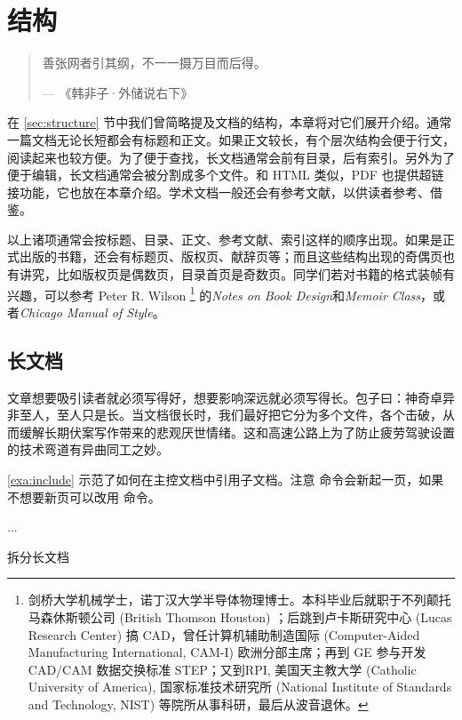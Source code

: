 \chapter{结构}
\label{chp:structure}

\begin{quotation}
善张网者引其纲，不一一摄万目而后得。
\begin{flushright}
--- 《韩非子·外储说右下》
\end{flushright}
\end{quotation}

在 \ref{sec:structure} 节中我们曾简略提及文档的结构，本章将对它们展开介绍。通常一篇文档无论长短都会有标题和正文。如果正文较长，有个层次结构会便于行文，阅读起来也较方便。为了便于查找，长文档通常会前有目录，后有索引。另外为了便于编辑，长文档通常会被分割成多个文件。和 HTML 类似，PDF 也提供超链接功能，它也放在本章介绍。学术文档一般还会有参考文献，以供读者参考、借鉴。

以上诸项通常会按标题、目录、正文、参考文献、索引这样的顺序出现。如果是正式出版的书籍，还会有标题页、版权页、献辞页等；而且这些结构出现的奇偶页也有讲究，比如版权页是偶数页，目录首页是奇数页。同学们若对书籍的格式装帧有兴趣，可以参考 Peter R. Wilson\indexWilson{} \footnote{剑桥大学机械学士，诺丁汉大学半导体物理博士。本科毕业后就职于不列颠托马森休斯顿公司 (British Thomson Houston) ；后跳到卢卡斯研究中心 (Lucas Research Center) 搞 CAD，曾任计算机辅助制造国际 (Computer-Aided Manufacturing International, CAM-I) 欧洲分部主席；再到 GE 参与开发 CAD/CAM 数据交换标准 STEP；又到RPI, 美国天主教大学 (Catholic University of America), 国家标准技术研究所 (National Institute of Standards and Technology, NIST) 等院所从事科研，最后从波音退休。} 的\emph{Notes on Book Design}\citep{Wilson_memdesign}和\emph{Memoir Class}\citep{Wilson_memoir}，或者\emph{Chicago Manual of Style}\citep{Chicago_style}。

\section{长文档}

文章想要吸引读者就必须写得好，想要影响深远就必须写得长。包子曰：神奇卓异非至人，至人只是长。当文档很长时，我们最好把它分为多个文件，各个击破，从而缓解长期伏案写作带来的悲观厌世情绪。这和高速公路上为了防止疲劳驾驶设置的技术弯道有异曲同工之妙。

\autoref{exa:include} 示范了如何在主控文档中引用子文档。注意 \verb|| 命令会新起一页，如果不想要新页可以改用 \verb|| 命令。

\begin{example}[htbp]
\begin{Code}[]



...

\end{Code}
\caption{拆分长文档}
\label{exa:include}
\end{example}

